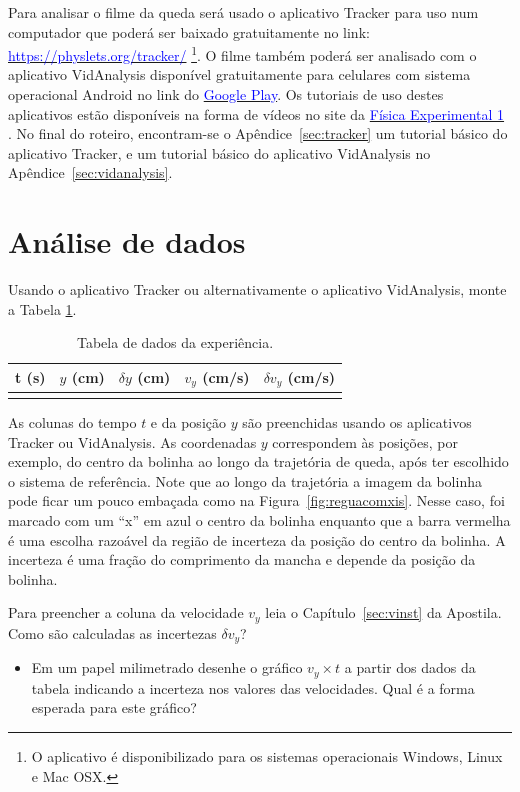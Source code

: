 Para analisar o filme da queda será usado o aplicativo Tracker para uso num computador 
que poderá ser baixado gratuitamente no link: 
\href{https://physlets.org/tracker/}{\textcolor {blue}
{https://physlets.org/tracker/}}
\footnote {O aplicativo é disponibilizado para os sistemas operacionais Windows, Linux e Mac OSX.}. 
O filme também poderá ser analisado com o aplicativo VidAnalysis disponível gratuitamente para celulares com sistema operacional Android no link  do
\href{https://play.google.com/store/apps/details?id=com.vidanalysis.free}{\textcolor {blue}
{Google Play}}. 
Os tutoriais de uso destes aplicativos estão disponíveis na forma de vídeos no site da \href{https://fisexp1.if.ufrj.br}{\textcolor {blue} {Física Experimental 1}} . 
No final do roteiro, encontram-se o Apêndice~\ref{sec:tracker} um tutorial básico do aplicativo Tracker, e um tutorial básico do aplicativo VidAnalysis no Apêndice~\ref{sec:vidanalysis}.  


\section{Análise de dados}
Usando o aplicativo Tracker ou alternativamente o aplicativo  VidAnalysis, monte a Tabela \ref{tabela1}.
\begin{table}[h]
\centering
\begin{tabular}{c|c|c|c|c}
t (s) & $y$ (cm) & $\delta y$ (cm)& $v_y$ (cm/s)& $\delta v_y$ (cm/s)\\
\hline 
&&&&  
\end{tabular}
\caption{Tabela de dados da experiência.}
\label{tabela1}
\end{table}
As colunas do tempo $t$ e da posição $y$ são preenchidas usando os aplicativos Tracker ou  VidAnalysis. As coordenadas $y$ correspondem às posições, por exemplo, do centro da bolinha ao longo da trajetória de queda, após ter escolhido o sistema de referência. Note que ao longo da trajetória a imagem da bolinha pode ficar um pouco embaçada como na Figura~\ref{fig:reguacomxis}.
Nesse caso, foi marcado com um ``x''  em azul 
o centro da bolinha enquanto que a barra vermelha é uma escolha razoável da região de incerteza
da posição do centro da bolinha.   A incerteza é uma fração do comprimento da mancha e depende da posição da bolinha.  

Para preencher a coluna da velocidade $v_y$ leia o Capítulo~\ref{sec:vinst} da Apostila.
Como são calculadas as incertezas $\delta v_y$?
\begin{itemize}
\item Em um papel milimetrado desenhe o gráfico $v_y \times t$ a partir dos dados da tabela indicando 
a incerteza nos valores das velocidades. Qual é a forma esperada para este gráfico?
\end{itemize}

